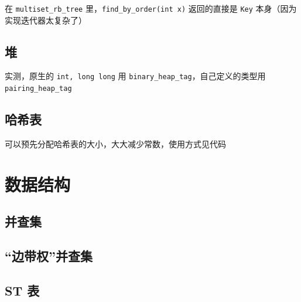 \documentclass[12pt]{article}
\theoremstyle{definition}
\theoremstyle{remark}
\begin{document}
在 \texttt{multiset\_{}rb\_{}tree} 里，\texttt{find\_{}by\_{}order(int x)} 返回的直接是 \texttt{Key} 本身（因为实现迭代器太复杂了）



\newpage

\subsection{堆}

实测，原生的 \texttt{int, long long} 用 \texttt{binary\_{}heap\_{}tag}，自己定义的类型用 \texttt{pairing\_{}heap\_{}tag}



\subsection{哈希表}

可以预先分配哈希表的大小，大大减少常数，使用方式见代码



\newpage

{\centering\section{数据结构}}

\subsection{并查集}



\newpage

\subsection{“边带权”并查集}



\newpage

\subsection{ST 表}


\end{document}

